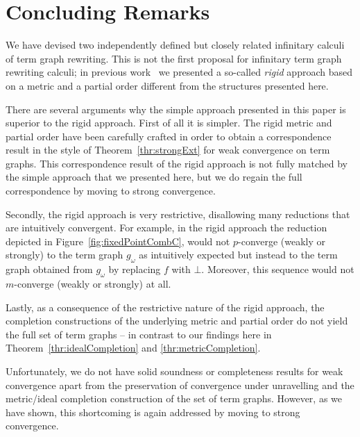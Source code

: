\documentclass[copyright,creativecommons,UKenglish,final]{eptcs}
\newcommand\prs{p}
\newcommand\mrs{m}
\theoremstyle{definition}
\theoremstyle{plain}
\begin{document}
\section{Concluding Remarks}
\label{sec:concluding-remarks}


We have devised two independently defined but closely related
infinitary calculi of term graph rewriting. This is not the first
proposal for infinitary term graph rewriting calculi; in previous
work~\cite{bahr12lmcs} we presented a so-called \emph{rigid} approach
based on a metric and a partial order different from the structures
presented here.

There are several arguments why the simple approach presented in this
paper is superior to the rigid approach. First of all it is
simpler. The rigid metric and partial order have been carefully
crafted in order to obtain a correspondence result in the style of
Theorem~\ref{thr:strongExt} for weak convergence on term graphs. This
correspondence result of the rigid approach is not fully matched by
the simple approach that we presented here, but we do regain the full
correspondence by moving to strong convergence.

Secondly, the rigid approach is very restrictive, disallowing many
reductions that are intuitively convergent. For example, in the rigid
approach the reduction depicted in Figure~\ref{fig:fixedPointCombC},
would not $\prs$-converge (weakly or strongly) to the term graph
$g_\omega$ as intuitively expected but instead to the term graph
obtained from $g_\omega$ by replacing $f$ with $\bot$. Moreover, this
sequence would not $\mrs$-converge (weakly or strongly) at all.

Lastly, as a consequence of the restrictive nature of the rigid
approach, the completion constructions of the underlying metric and
partial order do not yield the full set of term graphs -- in contrast
to our findings here in Theorem~\ref{thr:idealCompletion} and
\ref{thr:metricCompletion}.

Unfortunately, we do not have solid soundness or completeness results
for weak convergence apart from the preservation of convergence under
unravelling and the metric/ideal completion construction of the set of
term graphs. However, as we have shown, this shortcoming is again
addressed by moving to strong convergence.


\end{document}
